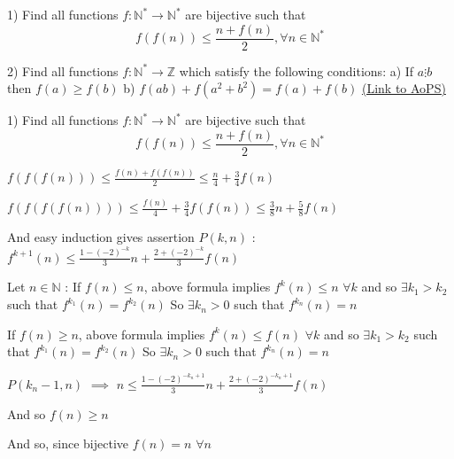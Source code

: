 \begin{problem}
	1) Find all  functions $f:\mathbb{N^*}\rightarrow \mathbb{N^*}$ are bijective  such that 
\[ f(f(n)) \le \dfrac{n+f(n)}{2}, \forall n \in \mathbb{N^*}\]

2) Find all functions $f:\mathbb{N}^* \to \mathbb{Z}$ which satisfy the following conditions: 
a) If $a \vdots b$ then $f(a) \geq f(b)$
b) $f(ab)+f\left ( a^2+b^2 \right ) = f(a)+f(b)$
	\flushright \href{https://artofproblemsolving.com/community/c6h564926}{(Link to AoPS)}
\end{problem}



\begin{solution}
	\begin{tcolorbox}1) Find all  functions $f:\mathbb{N^*}\rightarrow \mathbb{N^*}$ are bijective  such that 
\[ f(f(n)) \le \dfrac{n+f(n)}{2}, \forall n \in \mathbb{N^*}\]\end{tcolorbox}
$f(f(f(n)))\le \frac{f(n)+f(f(n))}2\le \frac n4+\frac 34f(n)$

$f(f(f(f(n))))\le \frac {f(n)}4+\frac 34f(f(n))\le \frac 38n+\frac 58f(n)$

And easy induction gives assertion $P(k,n)$ : $f^{k+1}(n)\le \frac{1-(-2)^{-k}}3n+\frac{2+(-2)^{-k}}3f(n)$

Let $n\in\mathbb N$ :
If $f(n)\le n$, above formula implies $f^{k}(n)\le n$ $\forall k$ and so $\exists k_1>k_2$ such that $f^{k_1}(n)=f^{k_2}(n)$ 
So $\exists k_n>0$ such that $f^{k_n}(n)=n$

If $f(n)\ge n$, above formula implies $f^{k}(n)\le f(n)$ $\forall k$ and so $\exists k_1>k_2$ such that $f^{k_1}(n)=f^{k_2}(n)$ 
So $\exists k_n>0$ such that $f^{k_n}(n)=n$

$P(k_n-1,n)$ $\implies$ $n\le \frac{1-(-2)^{-k_n+1}}3n+\frac{2+(-2)^{-k_n+1}}3f(n)$

And so $f(n)\ge n$

And so, since bijective $\boxed{f(n)=n}$ $\forall n$
\end{solution}




